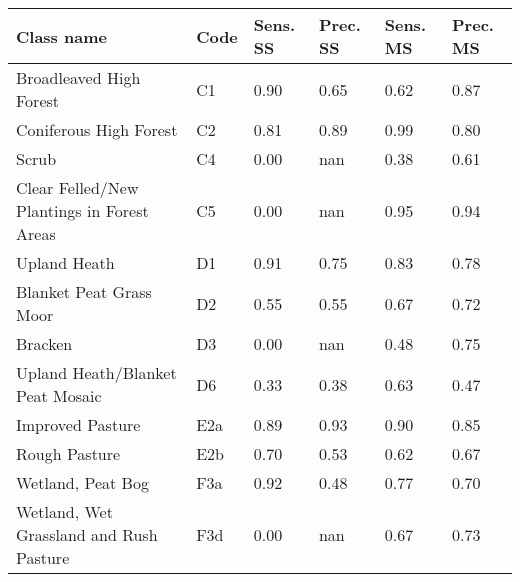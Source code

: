 \begin{tabular}{llllll}
\toprule
                       \textbf{Class name} & \textbf{Code} & \textbf{Sens. SS} & \textbf{Prec. SS} & \textbf{Sens. MS} & \textbf{Prec. MS} \\
\midrule
                   Broadleaved High Forest &            C1 &              0.90 &              0.65 &              0.62 &              0.87 \\
                    Coniferous High Forest &            C2 &              0.81 &              0.89 &              0.99 &              0.80 \\
                                     Scrub &            C4 &              0.00 &               nan &              0.38 &              0.61 \\
Clear Felled/New Plantings in Forest Areas &            C5 &              0.00 &               nan &              0.95 &              0.94 \\
                              Upland Heath &            D1 &              0.91 &              0.75 &              0.83 &              0.78 \\
                   Blanket Peat Grass Moor &            D2 &              0.55 &              0.55 &              0.67 &              0.72 \\
                                   Bracken &            D3 &              0.00 &               nan &              0.48 &              0.75 \\
          Upland Heath/Blanket Peat Mosaic &            D6 &              0.33 &              0.38 &              0.63 &              0.47 \\
                          Improved Pasture &           E2a &              0.89 &              0.93 &              0.90 &              0.85 \\
                             Rough Pasture &           E2b &              0.70 &              0.53 &              0.62 &              0.67 \\
                         Wetland, Peat Bog &           F3a &              0.92 &              0.48 &              0.77 &              0.70 \\
   Wetland, Wet Grassland and Rush Pasture &           F3d &              0.00 &               nan &              0.67 &              0.73 \\
\bottomrule
\end{tabular}
